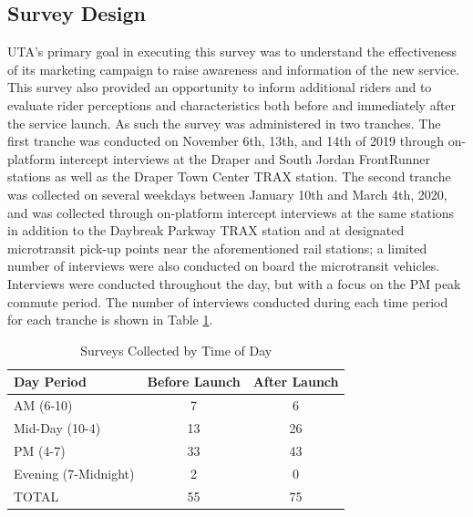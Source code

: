 \documentclass[smartcities,article,submit,moreauthors,pdftex]{Definitions/mdpi}
\begin{document}
\subsection{Survey Design}
UTA’s primary goal in executing this survey was to understand the effectiveness of its marketing campaign to raise awareness and information of the new service. This survey also provided an opportunity to inform additional riders and to evaluate rider perceptions and characteristics both before and immediately after the service launch. As such the survey was administered in two tranches. The first tranche was conducted on November 6th, 13th, and 14th of 2019 through on-platform intercept interviews at the Draper and South Jordan FrontRunner stations as well as the Draper Town Center TRAX station. The second tranche was collected on several weekdays between January 10th and March 4th, 2020, and was collected through on-platform intercept interviews at the same stations in addition to the Daybreak Parkway TRAX station and at designated microtransit pick-up points near the aforementioned rail stations; a limited number of interviews were also conducted on board the microtransit vehicles. Interviews were conducted throughout the day, but with a focus on the PM peak commute period. The number of interviews conducted during each time period for each tranche is shown in Table \ref{tab:survey-times}.

\begin{table}[ht]
    \centering
    \caption{Surveys Collected by Time of Day}
    \label{tab:survey-times}
    \begin{tabular}{lcc}
    \toprule
    Day Period           & Before   Launch & After   Launch \\
    \midrule
    AM (6-10)            & 7               & 6              \\
    Mid-Day (10-4)       & 13              & 26             \\
    PM (4-7)             & 33              & 43             \\
    Evening (7-Midnight) & 2               & 0              \\
    TOTAL                & 55              & 75            \\
    \bottomrule
    \end{tabular}
\end{table}
\end{document}
